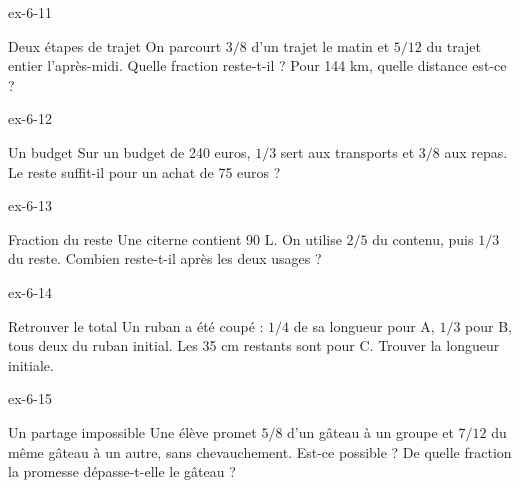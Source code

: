 \begin{blocLivre}{ex-6-11}\begin{exercice}[3]{Deux étapes de trajet}
On parcourt $3/8$ d’un trajet le matin et $5/12$ du trajet entier l’après-midi. Quelle fraction reste-t-il ? Pour 144 km, quelle distance est-ce ?
\end{exercice}\end{blocLivre}
\begin{blocLivre}{ex-6-12}\begin{exercice}[3]{Un budget}
Sur un budget de 240 euros, $1/3$ sert aux transports et $3/8$ aux repas. Le reste suffit-il pour un achat de 75 euros ?
\end{exercice}\end{blocLivre}
\begin{blocLivre}{ex-6-13}\begin{exercice}[3]{Fraction du reste}
Une citerne contient 90 L. On utilise $2/5$ du contenu, puis $1/3$ du reste. Combien reste-t-il après les deux usages ?
\end{exercice}\end{blocLivre}
\begin{blocLivre}{ex-6-14}\begin{exercice}[3]{Retrouver le total}
Un ruban a été coupé : $1/4$ de sa longueur pour A, $1/3$ pour B, tous deux du ruban initial. Les 35 cm restants sont pour C. Trouver la longueur initiale.
\end{exercice}\end{blocLivre}
\begin{blocLivre}{ex-6-15}\begin{exercice}[3]{Un partage impossible}
Une élève promet $5/8$ d’un gâteau à un groupe et $7/12$ du même gâteau à un autre, sans chevauchement. Est-ce possible ? De quelle fraction la promesse dépasse-t-elle le gâteau ?
\end{exercice}\end{blocLivre}

\clearpage
